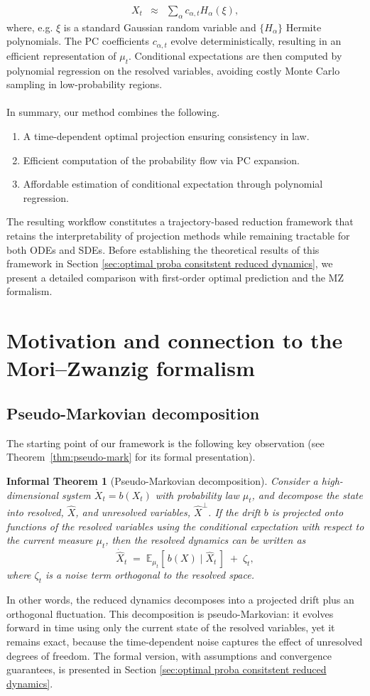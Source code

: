 \documentclass[11pt, a4paper, oneside, reqno]{amsart}
\newtheorem*{informaltheorem}{Informal Theorem}
\begin{document}
\begin{eqnarray}
X_t &\approx& \sum_{\alpha} c_{\alpha,t} H_\alpha(\xi),
\end{eqnarray}
where, e.g. $\xi$ is a standard Gaussian random variable and $\{H_\alpha\}$ Hermite polynomials. The PC coefficients $c_{\alpha,t}$ evolve deterministically, resulting in an efficient representation of $\mu_t$. Conditional expectations are then computed by polynomial regression on the resolved variables, avoiding costly Monte Carlo sampling in low-probability regions. \\ \ \\
In summary, our method combines the following.
\begin{enumerate}
\item  A time-dependent optimal projection ensuring consistency in law.
\item Efficient computation of the probability flow via PC expansion. 
\item Affordable estimation of conditional expectation through polynomial regression. 
\end{enumerate}
The resulting workflow constitutes a trajectory-based reduction framework that retains the interpretability of projection methods while remaining  tractable for both ODEs and SDEs. Before establishing the theoretical results of this framework in Section \ref{sec:optimal proba consitstent reduced dynamics}, we present a detailed comparison with first-order optimal prediction and the MZ formalism.
\section{Motivation and connection to the Mori–Zwanzig formalism}\label{sec:MZ}
\subsection{Pseudo-Markovian decomposition}
\noindent The starting point of our framework is the following key observation (see Theorem~\ref{thm:pseudo-mark} for its formal presentation). 
\begin{informaltheorem}[Pseudo-Markovian decomposition]
Consider a high-dimensional system $\dot{X}_t=b(X_t)$ with probability law $\mu_t$, and decompose the state  into resolved, $\hat{X}$, and unresolved variables, $\hat{X}^{\perp}$.  
If the drift $b$ is projected onto functions of the resolved variables using the conditional expectation with respect to the current measure $\mu_t$, then the resolved dynamics can be written as
\[
\dot{\hat{X}}_t \;=\; \mathbb{E}_{\mu_t}[\,{b}(X)\mid \hat{X}_t\,] \;+\; \zeta_t,
\]
where $\zeta_t$ is a noise term orthogonal to the resolved space.  
\end{informaltheorem}
\noindent In other words, the reduced dynamics decomposes into a projected drift plus an orthogonal fluctuation. This decomposition is {pseudo-Markovian}: it evolves forward in time using only the current state of the resolved variables, yet it remains exact, because the time-dependent noise captures the effect of unresolved degrees of freedom.   The formal version, with assumptions and convergence guarantees, is presented in Section \ref{sec:optimal proba consitstent reduced dynamics}. 
\end{document}
